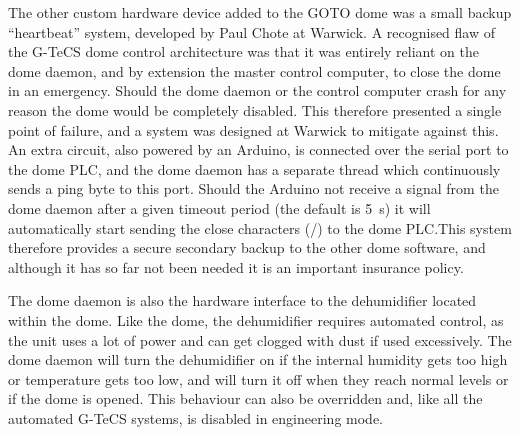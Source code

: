 \begin{colsection}
The other custom hardware device added to the GOTO dome was a small backup ``heartbeat'' system, developed by Paul Chote at Warwick. A recognised flaw of the G-TeCS dome control architecture was that it was entirely reliant on the dome daemon, and by extension the master control computer, to close the dome in an emergency. Should the dome daemon or the control computer crash for any reason the dome would be completely disabled. This therefore presented a single point of failure, and a system was designed at Warwick to mitigate against this. An extra circuit, also powered by an Arduino, is connected over the serial port to the dome PLC, and the dome daemon has a separate thread which continuously sends a ping byte to this port. Should the Arduino not receive a signal from the dome daemon after a given timeout period (the default is \SI{5}{\second}) it will automatically start sending the close characters (/) to the dome PLC.\@ This system therefore provides a secure secondary backup to the other dome software, and although it has so far not been needed it is an important insurance policy.

The dome daemon is also the hardware interface to the dehumidifier located within the dome. Like the dome, the dehumidifier requires automated control, as the unit uses a lot of power and can get clogged with dust if used excessively. The dome daemon will turn the dehumidifier on if the internal humidity gets too high or temperature gets too low, and will turn it off when they reach normal levels or if the dome is opened. This behaviour can also be overridden and, like all the automated G-TeCS systems, is disabled in engineering mode.

\end{colsection}


